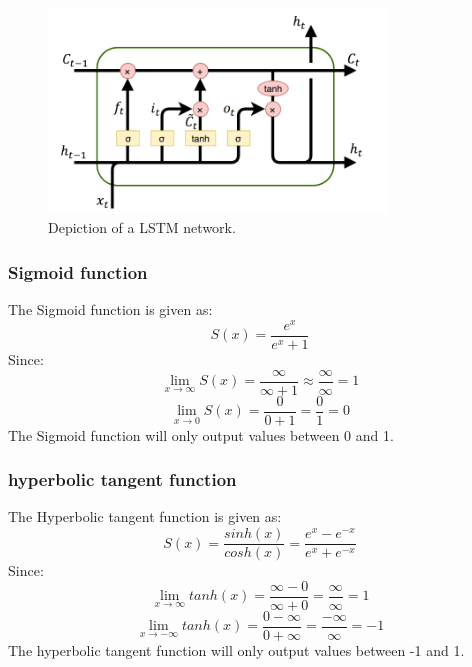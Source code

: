 \begin{figure}[H]
    \centering
    \includegraphics[width=0.8\textwidth]{data/Figures/Neural networks/lstm.png}
    \caption[Long Short-Term Memory network]{Depiction of a LSTM network.~\cite{dolphin_2021}}\label{fig:LSTM}
\end{figure}

\subsubsection{Sigmoid function}
The Sigmoid function is given as:
\begin{equation}
    S(x) = \frac{e^x}{e^x+1}
\end{equation}
Since: 
\begin{equation}
    \lim_{x \to \infty}S(x) = \frac{\infty}{\infty+1} \approx \frac{\infty}{\infty} = 1
\end{equation}
\begin{equation}
    \lim_{x \to 0}S(x) = \frac{0}{0+1} = \frac{0}{1} = 0
\end{equation}
The Sigmoid function will only output values between 0 and 1. 
\subsubsection{hyperbolic tangent function}
The Hyperbolic tangent function is given as:
\begin{equation}
    S(x) = \frac{sinh(x)}{cosh(x)} = \frac{e^x-e^{-x}}{e^x+e^{-x}}
\end{equation}
Since:
\begin{equation}
    \lim_{x \to \infty}tanh(x) = \frac{\infty - 0}{\infty + 0} = \frac{\infty}{\infty} = 1
\end{equation}
\begin{equation}
    \lim_{x \to -\infty}tanh(x) = \frac{0 - \infty}{0 + \infty} = \frac{-\infty}{\infty} = -1
\end{equation}
The hyperbolic tangent function will only output values between -1 and 1.

